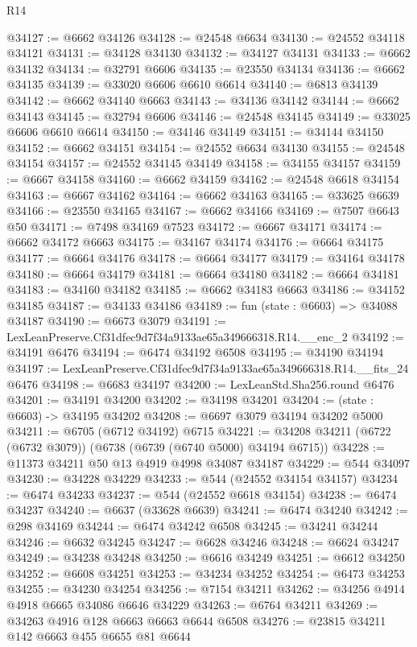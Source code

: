 \begin{lexlean}{R14}
\begin{coremodule}
@34127 := @6662 @34126
@34128 := @24548 @6634
@34130 := @24552 @34118 @34121
@34131 := @34128 @34130
@34132 := @34127 @34131
@34133 := @6662 @34132
@34134 := @32791 @6606
@34135 := @23550 @34134
@34136 := @6662 @34135
@34139 := @33020 @6606 @6610 @6614
@34140 := @6813 @34139
@34142 := @6662 @34140 @6663
@34143 := @34136 @34142
@34144 := @6662 @34143
@34145 := @32794 @6606
@34146 := @24548 @34145
@34149 := @33025 @6606 @6610 @6614
@34150 := @34146 @34149
@34151 := @34144 @34150
@34152 := @6662 @34151
@34154 := @24552 @6634 @34130
@34155 := @24548 @34154
@34157 := @24552 @34145 @34149
@34158 := @34155 @34157
@34159 := @6667 @34158
@34160 := @6662 @34159
@34162 := @24548 @6618 @34154
@34163 := @6667 @34162
@34164 := @6662 @34163
@34165 := @33625 @6639
@34166 := @23550 @34165
@34167 := @6662 @34166
@34169 := @7507 @6643 @50
@34171 := @7498 @34169 @7523
@34172 := @6667 @34171
@34174 := @6662 @34172 @6663
@34175 := @34167 @34174
@34176 := @6664 @34175
@34177 := @6664 @34176
@34178 := @6664 @34177
@34179 := @34164 @34178
@34180 := @6664 @34179
@34181 := @6664 @34180
@34182 := @6664 @34181
@34183 := @34160 @34182
@34185 := @6662 @34183 @6663
@34186 := @34152 @34185
@34187 := @34133 @34186
@34189 := fun (state : @6603) => @34088 @34187
@34190 := @6673 @3079
@34191 := LexLeanPreserve.Cf31dfec9d7f34a9133ae65a349666318.R14.__enc_2
@34192 := @34191 @6476
@34194 := @6474 @34192 @6508
@34195 := @34190 @34194
@34197 := LexLeanPreserve.Cf31dfec9d7f34a9133ae65a349666318.R14.__fits_24 @6476
@34198 := @6683 @34197
@34200 := LexLeanStd.Sha256.round @6476
@34201 := @34191 @34200
@34202 := @34198 @34201
@34204 := (state : @6603) -> @34195 @34202
@34208 := @6697 @3079 @34194 @34202 @5000
@34211 := @6705 (@6712 @34192) @6715
@34221 := @34208 @34211 (@6722 (@6732 @3079)) (@6738 (@6739 (@6740 @5000) @34194 @6715))
@34228 := @11373 @34211 @50 @13 @4919 @4998 @34087 @34187
@34229 := @544 @34097
@34230 := @34228 @34229
@34233 := @544 (@24552 @34154 @34157)
@34234 := @6474 @34233
@34237 := @544 (@24552 @6618 @34154)
@34238 := @6474 @34237
@34240 := @6637 (@33628 @6639)
@34241 := @6474 @34240
@34242 := @298 @34169
@34244 := @6474 @34242 @6508
@34245 := @34241 @34244
@34246 := @6632 @34245
@34247 := @6628 @34246
@34248 := @6624 @34247
@34249 := @34238 @34248
@34250 := @6616 @34249
@34251 := @6612 @34250
@34252 := @6608 @34251
@34253 := @34234 @34252
@34254 := @6473 @34253
@34255 := @34230 @34254
@34256 := @7154 @34211
@34262 := @34256 @4914 @4918 @6665 @34086 @6646 @34229
@34263 := @6764 @34211
@34269 := @34263 @4916 @128 @6663 @6663 @6644 @6508
@34276 := @23815 @34211 @142 @6663 @455 @6655 @81 @6644

\end{coremodule}
\end{lexlean}
